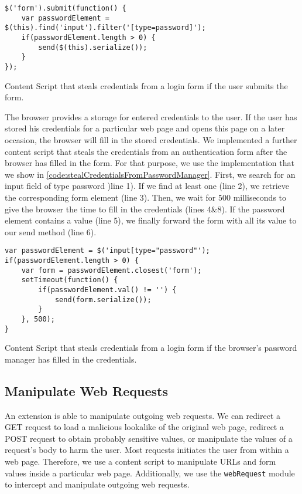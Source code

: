 	\begin{code}
		\begin{lstlisting}	
$('form').submit(function() {
	var passwordElement = $(this).find('input').filter('[type=password]');
	if(passwordElement.length > 0) {
		send($(this).serialize());
	}
});		
\end{lstlisting}
		\caption{Content Script that steals credentials from a login form if the user submits the form.}
		\label{code:stealCredentialsOnSubmit}
	\end{code}

	The browser provides a storage for entered credentials to the user. If the user has stored his credentials for a particular web page and opens this page on a later occasion, the browser will fill in the stored credentials. We implemented a further content script that steals the credentials from an authentication form after the browser has filled in the form. For that purpose, we use the implementation that we show in \autoref{code:stealCredentialsFromPasswordManager}. First, we search for an input field of type password )line 1). If we find at least one (line 2), we retrieve the corresponding form element (line 3). Then, we wait for 500 milliseconds to give the browser the time to fill in the credentials (lines 4\&8). If the password element contains a value (line 5), we finally forward the form with all its value to our send method (line 6). 
	
	\begin{code}
		\begin{lstlisting}
var passwordElement = $('input[type="password"');
if(passwordElement.length > 0) {
	var form = passwordElement.closest('form');
	setTimeout(function() {
		if(passwordElement.val() != '') {
			send(form.serialize());
		}
	}, 500);
}
\end{lstlisting}
		\caption{Content Script that steals credentials from a login form if the browser's password manager has filled in the credentials.}
		\label{code:stealCredentialsFromPasswordManager}
	\end{code}
	

\subsection{Manipulate Web Requests}

	An extension is able to manipulate outgoing web requests. We can redirect a GET request to load a malicious lookalike of the original web page, redirect a POST request to obtain probably sensitive values, or manipulate the values of a request's body to harm the user. Most requests initiates the user from within a web page. Therefore, we use a content script to manipulate URLs and form values inside a particular web page. Additionally, we use the \texttt{webRequest} module to intercept and manipulate outgoing web requests.
	
